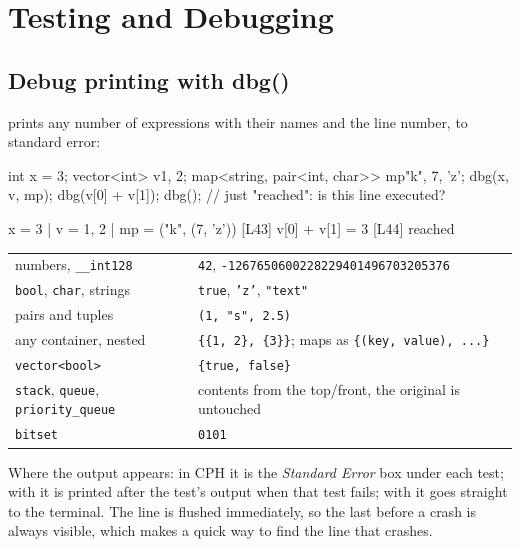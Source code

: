 \chapter{Testing and Debugging}\label{ch:testing}

\section{Debug printing with dbg()}\label{sec:dbg}

 prints any number of expressions with their names and the line number, to standard error:

\begin{code}
int x = 3; vector<int> v{1, 2};
map<string, pair<int, char>> mp{{"k", {7, 'z'}}};
dbg(x, v, mp);
dbg(v[0] + v[1]);
dbg();                                  // just "reached": is this line executed?
\end{code}
\begin{shell}
[L42] x = 3 | v = {1, 2} | mp = {("k", (7, 'z'))}
[L43] v[0] + v[1] = 3
[L44] reached
\end{shell}

\begin{center}
\begin{tabularx}{\linewidth}{p{4.8cm}L}
\toprule
{} &  \\
\midrule
numbers, \texttt{\_\_int128} & \texttt{42}, \texttt{-1267650600228229401496703205376} \\
\texttt{bool}, \texttt{char}, strings & \texttt{true}, \texttt{'z'}, \texttt{"text"} \\
pairs and tuples & \texttt{(1, "s", 2.5)} \\
any container, nested & \texttt{\{\{1, 2\}, \{3\}\}}; maps as \texttt{\{(key, value), ...\}} \\
\texttt{vector<bool>} & \texttt{\{true, false\}} \\
\texttt{stack}, \texttt{queue}, \texttt{priority\_queue} & contents from the top/front, the original is untouched \\
\texttt{bitset} & \texttt{0101} \\
\bottomrule
\end{tabularx}
\end{center}

Where the output appears: in CPH it is the \emph{Standard Error} box under each test; with  it is printed
after the test's output when that test fails; with  it goes straight to the terminal. The line is
flushed immediately, so the last  before a crash is always visible, which makes  a quick way
to find the line that crashes.

